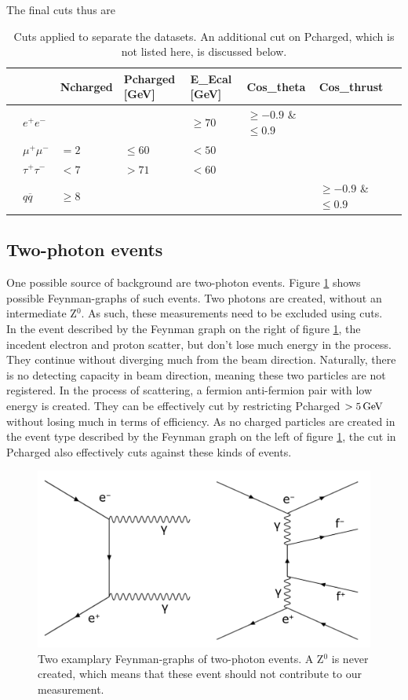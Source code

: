 The final cuts thus are
\begin{table}[H]\centering
	\begin{tabular}{@{}llllllll@{}}
		\toprule
		&			&Ncharged	&Pcharged [GeV]	&E\_Ecal [GeV] &Cos\_theta				&Cos\_thrust\\ 
		\midrule
		&$e^+e^-$	&			&				&$\ge70$		&$\ge-0.9$ \& $\le0.9$	&\\
		&$\mu^+\mu^-$		&$=2$			&$\le60$		&$<50$			&						&\\
		&$\tau^+\tau^-$		&$<7$		&$>71$			&$<60$			&						&\\
		&$q\overline{q}$		&$\ge8$		&				&				&						&$\ge-0.9$ \& $\le0.9$	\\
		\bottomrule
	\end{tabular}
	\caption[Table of cuts]{Cuts applied to separate the datasets. An additional cut on Pcharged, which is not listed here, is discussed below.}
\end{table}

\subsection{Two-photon events}
One possible source of background are two-photon events. Figure \ref{fig:twophotonfeynman} shows possible Feynman-graphs of such events. Two photons are created, without an intermediate Z$^0$. As such, these measurements need to be excluded using cuts.\\
In the event described by the Feynman graph on the right of figure \ref{fig:twophotonfeynman}, the incedent electron and proton scatter, but don't lose much energy in the process. They continue without diverging much from the beam direction. Naturally, there is no detecting capacity in beam direction, meaning these two particles are not registered. In the process of scattering, a fermion anti-fermion pair with low energy is created. They can be effectively cut by restricting Pcharged $> \unit[5]{GeV}$ without losing much in terms of efficiency.
As no charged particles are created in the event type described by the Feynman graph on the left of figure \ref{fig:twophotonfeynman}, the cut in Pcharged also effectively cuts against these kinds of events.
\begin{figure}[H]
\centering
\includegraphics[width=1.0\linewidth]{graphics/twophotonfeynman_both.pdf}
\caption[Two-photon Feynman-graph]{Two examplary Feynman-graphs of two-photon events. A Z$^0$ is never created, which means that these event should not contribute to our measurement.}
\label{fig:twophotonfeynman}
\end{figure}

